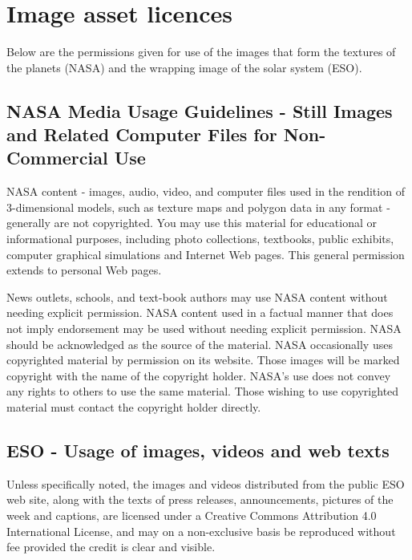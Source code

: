 \documentclass[twoside]{bhamthesis}
\begin{document}
\printbibliography

\appendix
\appendixpage
\addappheadtotoc

\section{Image asset licences}

Below are the permissions given for use of the images that form the textures of the planets (NASA) and the wrapping image of the solar system (ESO).

\subsection{NASA Media Usage Guidelines - Still Images and Related Computer Files for Non-Commercial Use}

NASA content - images, audio, video, and computer files used in the rendition of 3-dimensional models, such as texture maps and polygon data in any format - generally are not copyrighted. You may use this material for educational or informational purposes, including photo collections, textbooks, public exhibits, computer graphical simulations and Internet Web pages. This general permission extends to personal Web pages.

News outlets, schools, and text-book authors may use NASA content without needing explicit permission. NASA content used in a factual manner that does not imply endorsement may be used without needing explicit permission. NASA should be acknowledged as the source of the material. NASA occasionally uses copyrighted material by permission on its website. Those images will be marked copyright with the name of the copyright holder. NASA's use does not convey any rights to others to use the same material. Those wishing to use copyrighted material must contact the copyright holder directly.

\subsection{ESO - Usage of images, videos and web texts}

Unless specifically noted, the images and videos distributed from the public ESO web site, along with the texts of press releases, announcements, pictures of the week and captions, are licensed under a Creative Commons Attribution 4.0 International License, and may on a non-exclusive basis be reproduced without fee provided the credit is clear and visible.
\end{document}
